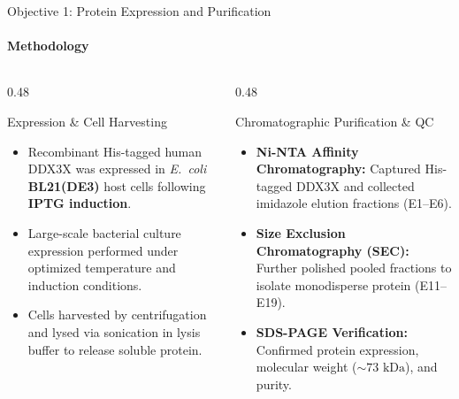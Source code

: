 \documentclass[aspectratio=169, 10pt]{beamer}
\begin{document}
\begin{frame}{Objective 1: Protein Expression and Purification}
  \framesubtitle{Methodology}
  \begin{columns}[T]
    \begin{column}{0.48\textwidth}
      \begin{block}{Expression \& Cell Harvesting}
        \small
        \begin{itemize}
          \item Recombinant His-tagged human DDX3X was expressed in \textit{E.\ coli} \textbf{BL21(DE3)} host cells following \textbf{IPTG induction}.
          \item Large-scale bacterial culture expression performed under optimized temperature and induction conditions.
          \item Cells harvested by centrifugation and lysed via sonication in lysis buffer to release soluble protein.
        \end{itemize}
      \end{block}
    \end{column}

    \begin{column}{0.48\textwidth}
      \begin{exampleblock}{Chromatographic Purification \& QC}
        \small
        \begin{itemize}
          \item \textbf{Ni-NTA Affinity Chromatography:} Captured His-tagged DDX3X and collected imidazole elution fractions (E1--E6).
          \item \textbf{Size Exclusion Chromatography (SEC):} Further polished pooled fractions to isolate monodisperse protein (E11--E19).
          \item \textbf{SDS-PAGE Verification:} Confirmed protein expression, molecular weight ($\sim 73\text{ kDa}$), and purity.
        \end{itemize}
      \end{exampleblock}
    \end{column}
  \end{columns}


\end{frame}
\end{document}
